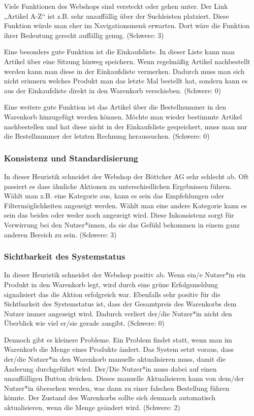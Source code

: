 \documentclass[utf8,biblatex]{lni}
\begin{document}
Viele Funktionen des Webshops sind versteckt oder gehen unter. Der Link „Artikel A-Z“ ist z.B. sehr unauffällig über der Suchleisten platziert. Diese Funktion würde man eher im Navigationsmenü erwarten. Dort wäre die Funktion ihrer Bedeutung gerecht auffällig genug. (Schwere: 3)

Eine besonders gute Funktion ist die Einkaufsliste. In dieser Liste kann man Artikel über eine Sitzung hinweg speichern. Wenn regelmäßig Artikel nachbestellt werden kann man diese in der Einkaufsliste vermerken. Dadurch muss man sich nicht erinnern welches Produkt man das letzte Mal bestellt hat, sondern kann es aus der Einkaufsliste direkt in den Warenkorb verschieben. (Schwere: 0)

Eine weitere gute Funktion ist das Artikel über die Bestellnummer in den Warenkorb hinzugefügt werden können. Möchte man wieder bestimmte Artikel nachbestellen und hat diese nicht in der Einkaufsliste gespeichert, muss man nur die Bestellnummer der letzten Rechnung heraussuchen. (Schwere: 0)


\subsubsection*{Konsistenz und Standardisierung}
In dieser Heuristik schneidet der Webshop der Böttcher AG sehr schlecht ab. Oft passiert es dass ähnliche Aktionen zu unterschiedlichen Ergebnissen führen. Wählt man z.B. eine Kategorie aus, kann es sein das Empfehlungen oder Filtermöglichkeiten angezeigt werden. Wählt man eine andere Kategorie kann es sein das beides oder weder noch angezeigt wird. Diese Inkonsistenz sorgt für Verwirrung bei den Nutzer*innen, da sie das Gefühl bekommen in einem ganz anderen Bereich zu sein. (Schwere: 3)


\subsubsection*{Sichtbarkeit des Systemstatus}
In dieser Heuristik schneidet der Webshop positiv ab. Wenn ein/e Nutzer*in ein Produkt in den Warenkorb legt, wird durch eine grüne Erfolgsmeldung signalisiert das die Aktion erfolgreich war. Ebenfalls sehr positiv für die Sichtbarkeit des Systemstatus ist, dass der Gesamtpreis des Warenkorbs dem Nutzer immer angezeigt wird. Dadurch verliert der/die Nutzer*in nicht den Überblick wie viel er/sie gerade ausgibt. (Schwere: 0)

Dennoch gibt es kleinere Probleme. Ein Problem findet statt, wenn man im Warenkorb die Menge eines Produkts ändert. Das System setzt voraus, dass der/die Nutzer*in den Warenkorb manuelle aktualisieren muss, damit die Änderung durchgeführt wird. Der/Die Nutzer*in muss dabei auf einen unauffälligen Button drücken. Dieses manuelle Aktualisieren kann von dem/der Nutzer*in übersehen werden, was dann zu einer falschen Bestellung führen könnte. Der Zustand des Warenkorbs sollte sich demnach automatisch aktualisieren, wenn die Menge geändert wird. (Schwere: 2)
\end{document}
